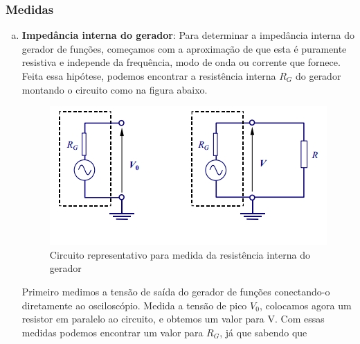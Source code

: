 \documentclass[10pt,letterpaper]{article}
\begin{document}
\subsubsection{Medidas}
\begin{enumerate}[(a)]
\item \textbf{Impedância interna do gerador}: Para determinar a impedância interna do gerador de funções, começamos com a aproximação de que esta é puramente resistiva e independe da frequência, modo de onda ou corrente que fornece. Feita essa hipótese, podemos encontrar a resistência interna $R_G$ do gerador montando o circuito como na figura abaixo. 
  \begin{figure}[!htb]
    \centering
    \label{impger}
    \includegraphics[scale=0.5]{impger.jpg}
    \caption{Circuito representativo para medida da resistência interna do gerador}
  \end{figure}
Primeiro medimos a tensão de saída do gerador de funções conectando-o diretamente ao osciloscópio. Medida a tensão de pico $V_0$, colocamos agora um resistor em paralelo ao circuito, e obtemos um valor para V. Com essas medidas podemos encontrar um valor para $R_G$, já que sabendo que 
\end{enumerate}
\end{document}
